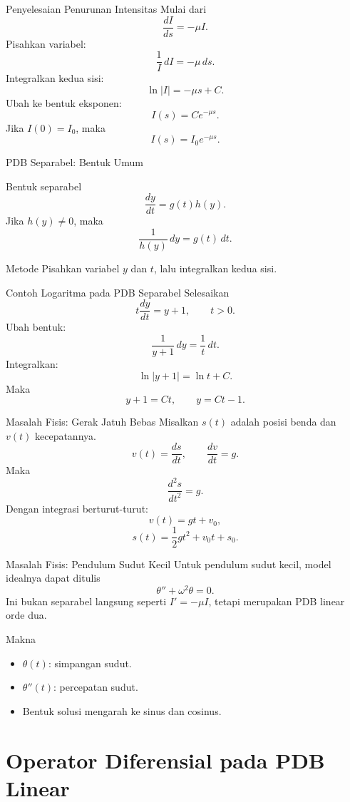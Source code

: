 \documentclass[aspectratio=169,11pt]{beamer}
\begin{document}
\begin{frame}{Penyelesaian Penurunan Intensitas}
Mulai dari
\[
\frac{dI}{ds}=-\mu I.
\]
Pisahkan variabel:
\[
\frac{1}{I}\,dI=-\mu\,ds.
\]
Integralkan kedua sisi:
\[
\ln |I|=-\mu s+C.
\]
Ubah ke bentuk eksponen:
\[
I(s)=C e^{-\mu s}.
\]
Jika $I(0)=I_0$, maka
\[
\boxed{I(s)=I_0 e^{-\mu s}}.
\]
\end{frame}

\begin{frame}{PDB Separabel: Bentuk Umum}
\begin{block}{Bentuk separabel}
\[
\frac{dy}{dt}=g(t)h(y).
\]
Jika $h(y)\neq 0$, maka
\[
\frac{1}{h(y)}\,dy=g(t)\,dt.
\]
\end{block}
\begin{block}{Metode}
Pisahkan variabel $y$ dan $t$, lalu integralkan kedua sisi.
\end{block}
\end{frame}

\begin{frame}{Contoh Logaritma pada PDB Separabel}
Selesaikan
\[
t\frac{dy}{dt}=y+1,\qquad t>0.
\]
Ubah bentuk:
\[
\frac{1}{y+1}\,dy=\frac{1}{t}\,dt.
\]
Integralkan:
\[
\ln |y+1|=\ln t+C.
\]
Maka
\[
y+1=Ct,
\qquad \boxed{y=Ct-1}.
\]
\end{frame}

\begin{frame}{Masalah Fisis: Gerak Jatuh Bebas}
Misalkan $s(t)$ adalah posisi benda dan $v(t)$ kecepatannya.
\[
v(t)=\frac{ds}{dt},\qquad \frac{dv}{dt}=g.
\]
Maka
\[
\frac{d^2s}{dt^2}=g.
\]
Dengan integrasi berturut-turut:
\[
v(t)=gt+v_0,
\]
\[
s(t)=\frac{1}{2}gt^2+v_0t+s_0.
\]
\end{frame}

\begin{frame}{Masalah Fisis: Pendulum Sudut Kecil}
Untuk pendulum sudut kecil, model idealnya dapat ditulis
\[
\theta''+\omega^2\theta=0.
\]
Ini bukan separabel langsung seperti $I'=-\mu I$, tetapi merupakan PDB linear orde dua.
\begin{block}{Makna}
\begin{itemize}
\item $\theta(t)$: simpangan sudut.
\item $\theta''(t)$: percepatan sudut.
\item Bentuk solusi mengarah ke sinus dan cosinus.
\end{itemize}
\end{block}
\end{frame}

\section{Operator Diferensial pada PDB Linear}
\end{document}
